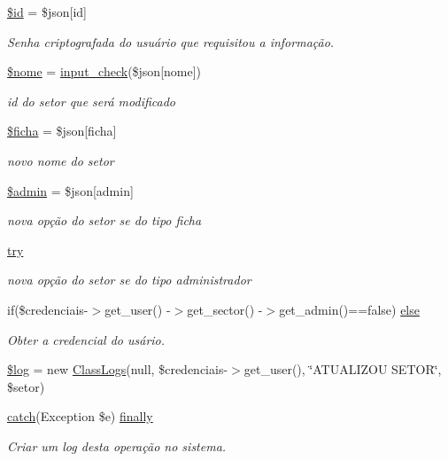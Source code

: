 \begin{DoxyCompactItemize}
\hyperlink{setores_2update_8php_ae97941710d863131c700f069b109991e}{\$id} = \$json\mbox{[}\textquotesingle{}id\textquotesingle{}\mbox{]}
\begin{DoxyCompactList}\small\item\em Senha criptografada do usuário que requisitou a informação. \end{DoxyCompactList}\item 
\hyperlink{setores_2update_8php_ac8c9d9dd5d90fa5854f0cb8397084ebd}{\$nome} = \hyperlink{_header_8php_a8909d20d656fecf83ebaa2bed0cab2c1}{input\+\_\+check}(\$json\mbox{[}\textquotesingle{}nome\textquotesingle{}\mbox{]})
\begin{DoxyCompactList}\small\item\em id do setor que será modificado \end{DoxyCompactList}\item 
\hyperlink{setores_2update_8php_aab83e7ad10d8c95fdbf231d086b83a1f}{\$ficha} = \$json\mbox{[}\textquotesingle{}ficha\textquotesingle{}\mbox{]}
\begin{DoxyCompactList}\small\item\em novo nome do setor \end{DoxyCompactList}\item 
\hyperlink{setores_2update_8php_ad3b3c64b25fbbb6aec24407e4333aa71}{\$admin} = \$json\mbox{[}\textquotesingle{}admin\textquotesingle{}\mbox{]}
\begin{DoxyCompactList}\small\item\em nova opção do setor se do tipo ficha \end{DoxyCompactList}\item 
\hyperlink{setores_2update_8php_abe4cc9788f52e49485473dc699537388}{try}
\begin{DoxyCompactList}\small\item\em nova opção do setor se do tipo administrador \end{DoxyCompactList}\item 
if(\$credenciais-\/$>$get\+\_\+user() -\/$>$get\+\_\+sector() -\/$>$get\+\_\+admin()==false) \hyperlink{setores_2update_8php_a96db4ecde3fc28a58d5ddae82826b84c}{else}
\begin{DoxyCompactList}\small\item\em Obter a credencial do usário. \end{DoxyCompactList}\item 
\hyperlink{setores_2update_8php_a9a2cf15a653aee8be437f7ae474cd494}{\$log} = new \hyperlink{class_class_logs}{Class\+Logs}(null, \$credenciais-\/$>$get\+\_\+user(), \char`\"{}A\+T\+U\+A\+L\+I\+Z\+OU S\+E\+T\+OR\char`\"{}, \$setor)
\item 
\hyperlink{imprimir_2ficha_2index_8php_a8104793004944f01dd070fc8b1ade3c4}{catch}(Exception \$e) \hyperlink{setores_2update_8php_a1eb47d68a4a4f73debf91b15e179d813}{finally}
\begin{DoxyCompactList}\small\item\em Criar um log desta operação no sistema. \end{DoxyCompactList}\end{DoxyCompactItemize}


